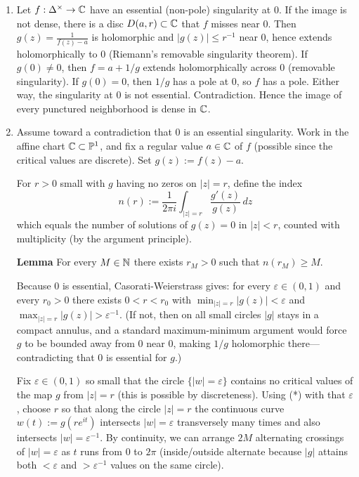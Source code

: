 \documentclass[12pt]{article}  %
\newenvironment{lemma}{\begin{mdframed}[backgroundcolor=gray!20] \textbf{Lemma}}{\end{mdframed}}
\begin{document}
\begin{solution}
\begin{enumerate}
  \item Let $f:\Delta^\times\to\mathbb{C}$ have an essential (non-pole) singularity at 0. If the image is not dense, there is a disc $D(a,r)\subset\mathbb{C}$ that $f$ misses near 0. Then $g(z)=\frac{1}{f(z)-a}$ is holomorphic and $|g(z)|\le r^{-1}$ near 0, hence extends holomorphically to 0 (Riemann's removable singularity theorem). If $g(0)\ne0$, then $f=a+1/g$ extends holomorphically across 0 (removable singularity). If $g(0)=0$, then $1/g$ has a pole at 0, so $f$ has a pole. Either way, the singularity at 0 is not essential. Contradiction. Hence the image of every punctured neighborhood is dense in $\mathbb{C}$.

  \item Assume toward a contradiction that 0 is an essential singularity. Work in the affine chart $\mathbb{C}\subset\mathbb{P}^1$, and fix a regular value $a\in\mathbb{C}$ of $f$ (possible since the critical values are discrete). Set $g(z):=f(z)-a$.

  For $r>0$ small with $g$ having no zeros on $|z|=r$, define the index \[n(r):=\frac{1}{2\pi i}\int_{|z|=r}\frac{g'(z)}{g(z)}\,dz\] which equals the number of solutions of $g(z)=0$ in $|z|<r$, counted with multiplicity (by the argument principle). 

\begin{lemma}
For every $M\in\mathbb{N}$ there exists $r_M>0$ such that $n(r_M)\ge M$.
\end{lemma}
Because 0 is essential, Casorati-Weierstrass gives: for every $\varepsilon\in(0,1)$ and every $r_0>0$ there exists $0<r<r_0$ with $\min_{|z|=r}|g(z)|<\varepsilon$ and $\max_{|z|=r}|g(z)|>\varepsilon^{-1}$. (If not, then on all small circles $|g|$ stays in a compact annulus, and a standard maximum-minimum argument would force $g$ to be bounded away from 0 near 0, making $1/g$ holomorphic there—contradicting that 0 is essential for $g$.)

  Fix $\varepsilon\in(0,1)$ so small that the circle $\{|w|=\varepsilon\}$ contains no critical values of the map $g$ from $|z|=r$ (this is possible by discreteness). Using (*) with that $\varepsilon$, choose $r$ so that along the circle $|z|=r$ the continuous curve $w(t):=g(re^{it})$ intersects $|w|=\varepsilon$ transversely many times and also intersects $|w|=\varepsilon^{-1}$. By continuity, we can arrange $2M$ alternating crossings of $|w|=\varepsilon$ as $t$ runs from 0 to $2\pi$ (inside/outside alternate because $|g|$ attains both $<\varepsilon$ and $>\varepsilon^{-1}$ values on the same circle).


\end{enumerate}
\end{solution}
\end{document}
